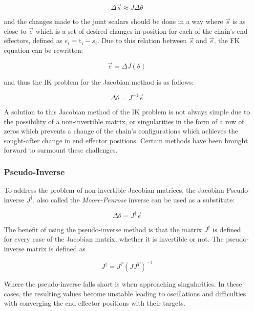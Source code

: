\begin{equation}
    \Delta \vec{s} \approx J \Delta \theta
\end{equation}

and the changes made to the joint scalars should be done in a way where
\(\vec{s}\) is as close to \(\vec{e}\) which is a set of desired changes in position
for each of the chain's end effectors, defined as \(e_i = \mbox{t}_i - s_i\).
Due to this relation between \(\vec{s}\) and \(\vec{e}\), the FK equation can
be rewritten:

\begin{equation}
    \vec{e} = \Delta J(\theta)
\end{equation}

and thus the IK problem for the Jacobian method is as follows:

\begin{equation}
    \Delta \theta = J^{-1} \vec{e}
\end{equation}

A solution to this Jacobian method of the IK problem is not always simple due to
the possibility of a non-invertible matrix, or singularities in the form of
a row of zeros which prevents a change of the chain's configurations which
achieves the sought-after change in end effector positions. Certain methods have
been brought forward to surmount these challenges.

\subsubsection{Pseudo-Inverse}
To address the problem of non-invertible Jacobian matrices, the Jacobian
Pseudo-inverse \(J^\dagger\), also called the \textit{Moore-Penrose} inverse can be used as
a substitute:

\begin{equation}
    \Delta \theta = J^{\dagger}\vec{e}
\end{equation}

The benefit of using the pseudo-inverse method is that the matrix \(J^\dagger\)
is defined for every case of the Jacobian matrix, whether it is invertible or
not. The pseudo-inverse matrix is defined as

\begin{equation}
    J^\dagger = J^T (J J^T)^{-1}
\end{equation}

Where the pseudo-inverse falls short is when approaching singularities. In these
cases, the resulting values become unstable leading to oscillations and
difficulties with converging the end effector positions with their targets.

